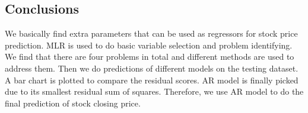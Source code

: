 \documentclass[a0,portrait]{a0poster}
\begin{document}
\begin{multicols}{3}
\color{SaddleBrown} %

\section*{Conclusions}
We basically find extra parameters that can be used as regressors for stock price prediction. MLR is used to do basic variable selection and problem identifying. We find that there are four problems in total and different methods are used to address them. Then we do predictions of different models on the testing dataset. A bar chart is plotted to compare the residual scores. AR model is finally picked due to its smallest residual sum of squares. Therefore, we use AR model to do the final prediction of stock closing price.
\color{Black} %



\end{multicols}
\end{document}
